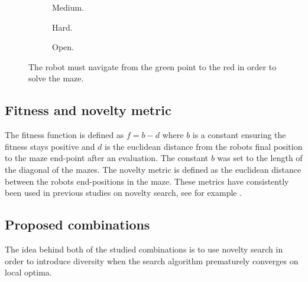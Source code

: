 \begin{figure}[H]
    \captionsetup[subfigure]{justification=centering}
    \centering
    \begin{mdframed}
        \begin{subfigure}[b]{0.3\textwidth}
            \centering
            \scalebox{0.25}{}
            \caption{Medium.}
        \end{subfigure}
        \begin{subfigure}[b]{0.3\textwidth}
            \centering
            \scalebox{0.25}{}
            \caption{Hard.}
        \end{subfigure}
        \begin{subfigure}[b]{0.3\textwidth}
            \centering
            \scalebox{0.25}{}
            \caption{Open.}
        \end{subfigure}
    \end{mdframed}
    \caption{The robot must navigate from the green point to the red in order to solve the maze.}
    \label{mazes}
\end{figure}


\subsection{Fitness and novelty metric}
\label{subsection:metrics}
The fitness function is defined as $f = b - d$ where $b$ is a constant ensuring the fitness stays positive
and $d$ is the euclidean distance from the robots final position to the maze end-point after an evaluation.
The constant $b$ was set to the length of the diagonal of the mazes.
The novelty metric is defined as the euclidean distance between the robots end-positions in the maze.
These metrics have consistently been used in previous studies on novelty search, see for example \cite{ns_study,novelty_alone}.

\subsection{Proposed combinations}
\label{subsection:linearisation}
The idea behind both of the studied combinations is to use novelty search in order to introduce diversity
when the search algorithm prematurely converges on local optima.

